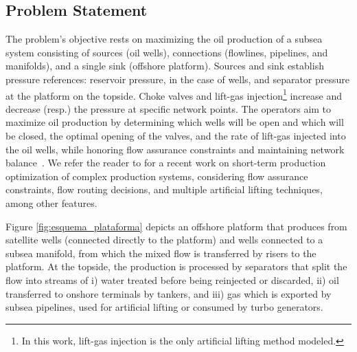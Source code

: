 \documentclass[pdflatex,sn-mathphys-num]{sn-jnl}%
\begin{document}
\subsection{Problem Statement}

The problem's objective rests on maximizing the oil production of a subsea system consisting of sources (oil wells), connections (flowlines, pipelines, and manifolds), and a single sink (offshore platform).
Sources and sink establish pressure references: reservoir pressure, in the case of wells, and separator pressure at the platform on the topside.
Choke valves and lift-gas injection\footnote{In this work, lift-gas injection is the only artificial lifting method modeled.} increase and decrease (resp.) the pressure at specific network points.
The operators aim to maximize oil production by determining which wells will be open and which will be closed, the optimal opening of the valves, and the rate of lift-gas injected into the oil wells, while honoring flow assurance constraints and maintaining network balance~\citep{CODAS2012222}.
We refer the reader to \citeauthor{Muller2022}\cite{Muller2022} for a recent work on short-term production optimization of complex production systems, considering flow assurance constraints, flow routing decisions, and multiple artificial lifting techniques, among other features.


Figure \ref{fig:esquema_plataforma} depicts an offshore platform that produces  from satellite wells (connected directly to the platform) and wells connected to a subsea manifold, from which the mixed flow is transferred by risers to the platform. At the topside, the production is processed by separators that split the flow into streams of i) water treated before being reinjected or discarded, ii) oil transferred to onshore terminals by tankers, and iii) gas which is exported by subsea pipelines, used for artificial lifting or consumed by turbo generators. 
\end{document}
